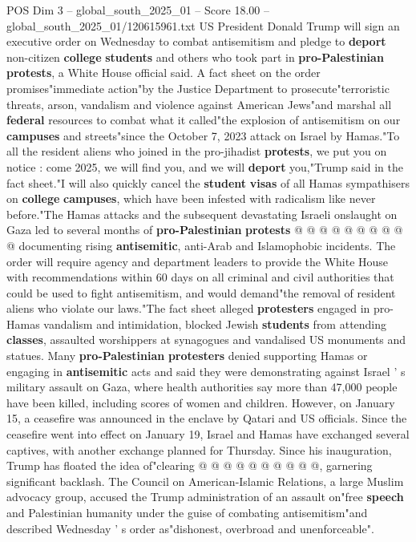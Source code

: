 \begin{textsample}{POS Dim 3 – global\_south\_2025\_01 – Score 18.00 – global\_south\_2025\_01/120615961.txt}  \label{ex:f3_pos_399}
US President Donald Trump will sign an executive order on Wednesday to combat antisemitism and pledge to \textbf{deport} non-citizen \textbf{college} \textbf{students} and others who took part in \textbf{pro-Palestinian} \textbf{protests}, a White House official said.
A fact sheet on the order promises"immediate action"by the Justice Department to prosecute"terroristic threats, arson, vandalism and violence against American Jews"and marshal all \textbf{federal} resources to combat what it called"the explosion of antisemitism on our \textbf{campuses} and streets"since the October 7, 2023 attack on Israel by Hamas."To all the resident aliens who joined in the pro-jihadist \textbf{protests}, we put you on notice : come 2025, we will find you, and we will \textbf{deport} you,"Trump said in the fact sheet."I will also quickly cancel the \textbf{student} \textbf{visas} of all Hamas sympathisers on \textbf{college} \textbf{campuses}, which have been infested with radicalism like never before."The Hamas attacks and the subsequent devastating Israeli onslaught on Gaza led to several months of \textbf{pro-Palestinian} \textbf{protests} @ @ @ @ @ @ @ @ @ @ documenting rising \textbf{antisemitic}, anti-Arab and Islamophobic incidents.
The order will require agency and department leaders to provide the White House with recommendations within 60 days on all criminal and civil authorities that could be used to fight antisemitism, and would demand"the removal of resident aliens who violate our laws."The fact sheet alleged \textbf{protesters} engaged in pro-Hamas vandalism and intimidation, blocked Jewish \textbf{students} from attending \textbf{classes}, assaulted worshippers at synagogues and vandalised US monuments and statues.
Many \textbf{pro-Palestinian} \textbf{protesters} denied supporting Hamas or engaging in \textbf{antisemitic} acts and said they were demonstrating against Israel ' s military assault on Gaza, where health authorities say more than 47,000 people have been killed, including scores of women and children.
However, on January 15, a ceasefire was announced in the enclave by Qatari and US officials.
Since the ceasefire went into effect on January 19, Israel and Hamas have exchanged several captives, with another exchange planned for Thursday.
Since his inauguration, Trump has floated the idea of"clearing @ @ @ @ @ @ @ @ @ @, garnering significant backlash.
The Council on American-Islamic Relations, a large Muslim advocacy group, accused the Trump administration of an assault on"free \textbf{speech} and Palestinian humanity under the guise of combating antisemitism"and described Wednesday ' s order as"dishonest, overbroad and unenforceable".

\end{textsample}

